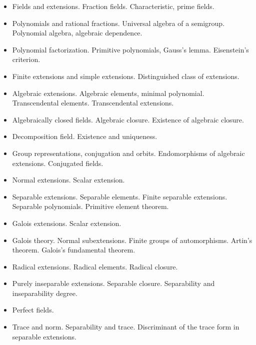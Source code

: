 \documentclass[spanish]{article}
\begin{document}
\begin{itemize}
  \item
Fields and extensions. Fraction fields. Characteristic, prime fields.

  \item
Polynomials and rational fractions. Universal algebra of a semigroup.
Polynomial algebra, algebraic dependence.

  \item
Polynomial factorization. Primitive polynomials, Gauss's lemma. Eisenstein's criterion.

  \item
Finite extensions and simple extensions. Distinguished class of extensions.

  \item
Algebraic extensions. Algebraic elements, minimal polynomial. Transcendental elements.
Transcendental extensions.

  \item
Algebraically closed fields. Algebraic closure.
Existence of algebraic closure.

  \item
Decomposition field. Existence and uniqueness.

  \item
Group representations, conjugation and orbits. Endomorphisms of algebraic
extensions. Conjugated fields.

  \item
Normal extensions. Scalar extension.

  \item
Separable extensions. Separable elements. Finite separable extensions. Separable
polynomials. Primitive element theorem.

  \item
Galois extensions. Scalar extension.

  \item
Galois theory. Normal subextensions. Finite groups of automorphisms. Artin's theorem.
Galois's fundamental theorem.

  \item
Radical extensions. Radical elements. Radical closure.

  \item
Purely inseparable extensions. Separable closure. Separability and inseparability
degree.

  \item
Perfect fields.

  \item
Trace and norm. Separability and trace. Discriminant of the trace form in separable
extensions.


\end{itemize}
\end{document}

